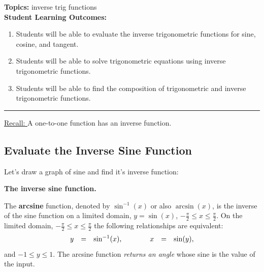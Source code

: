 


\noindent \textbf{Topics:}  inverse trig functions\\

\noindent \textbf{Student Learning Outcomes:}
\begin{enumerate}
\item Students will be able to evaluate the inverse trigonometric functions for sine, cosine, and tangent.
\item Students will be able to solve trigonometric equations using inverse trigonometric functions.
\item Students will be able to find the composition of trigonometric and inverse trigonometric functions.
\end{enumerate}

\hrule 

\bigskip

\noindent \underline{Recall:  } A one-to-one function has an inverse function.
\subsection{Evaluate the Inverse Sine Function}

Let's draw a graph of sine and find it's inverse function:
\vfill

   \noindent\colorbox{blue!10}{%
   \parbox{\dimexpr\linewidth}%
   {%
     \textbf{The inverse sine function.}

     The \textbf{arcsine} function, denoted by $\sin^{-1}(x)$ or also
     $\arcsin(x)$, is the inverse of the sine function on a limited
     domain, $y=\sin(x)$, $-\frac{\pi}{2} \leq x \leq
     \frac{\pi}{2}$. On the limited domain,
     $-\frac{\pi}{2} \leq x \leq \frac{\pi}{2}$ the following
     relationships are equivalent:
     \begin{eqnarray*}
       \begin{array}{rcl@{\hspace{4em}}rcl}
         y & = & \sin^{-1}(x), & x & = & \sin(y),
       \end{array}
     \end{eqnarray*}
     and $-1 \leq y \leq 1$. The arcsine function \textit{returns an
       angle} whose sine is the value of the input.

     }
 }

